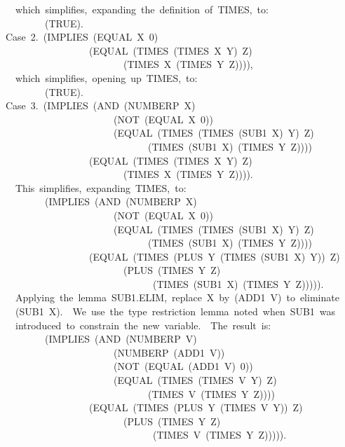 \documentclass[11pt]{book}
\newenvironment{pubasis}{\begin{flushleft}\ttfamily\small}{\normalsize\rmfamily\end{flushleft}}
\begin{document}
\begin{pubasis}
~~which~simplifies,~expanding~the~definition~of~TIMES,~to:\\

~~~~~~~~(TRUE).\\

Case~2.~(IMPLIES~(EQUAL~X~0)\\
~~~~~~~~~~~~~~~~~(EQUAL~(TIMES~(TIMES~X~Y)~Z)\\
~~~~~~~~~~~~~~~~~~~~~~~~(TIMES~X~(TIMES~Y~Z)))),\\

~~which~simplifies,~opening~up~TIMES,~to:\\

~~~~~~~~(TRUE).\\

Case~3.~(IMPLIES~(AND~(NUMBERP~X)\\
~~~~~~~~~~~~~~~~~~~~~~(NOT~(EQUAL~X~0))\\
~~~~~~~~~~~~~~~~~~~~~~(EQUAL~(TIMES~(TIMES~(SUB1~X)~Y)~Z)\\
~~~~~~~~~~~~~~~~~~~~~~~~~~~~~(TIMES~(SUB1~X)~(TIMES~Y~Z))))\\
~~~~~~~~~~~~~~~~~(EQUAL~(TIMES~(TIMES~X~Y)~Z)\\
~~~~~~~~~~~~~~~~~~~~~~~~(TIMES~X~(TIMES~Y~Z)))).\\

~~This~simplifies,~expanding~TIMES,~to:\\

~~~~~~~~(IMPLIES~(AND~(NUMBERP~X)\\
~~~~~~~~~~~~~~~~~~~~~~(NOT~(EQUAL~X~0))\\
~~~~~~~~~~~~~~~~~~~~~~(EQUAL~(TIMES~(TIMES~(SUB1~X)~Y)~Z)\\
~~~~~~~~~~~~~~~~~~~~~~~~~~~~~(TIMES~(SUB1~X)~(TIMES~Y~Z))))\\
~~~~~~~~~~~~~~~~~(EQUAL~(TIMES~(PLUS~Y~(TIMES~(SUB1~X)~Y))~Z)\\
~~~~~~~~~~~~~~~~~~~~~~~~(PLUS~(TIMES~Y~Z)\\
~~~~~~~~~~~~~~~~~~~~~~~~~~~~~~(TIMES~(SUB1~X)~(TIMES~Y~Z))))).\\

~~Applying~the~lemma~SUB1.ELIM,~replace~X~by~(ADD1~V)~to~eliminate\\
~~(SUB1~X).~~We~use~the~type~restriction~lemma~noted~when~SUB1~was\\
~~introduced~to~constrain~the~new~variable.~~The~result~is:\\

~~~~~~~~(IMPLIES~(AND~(NUMBERP~V)\\
~~~~~~~~~~~~~~~~~~~~~~(NUMBERP~(ADD1~V))\\
~~~~~~~~~~~~~~~~~~~~~~(NOT~(EQUAL~(ADD1~V)~0))\\
~~~~~~~~~~~~~~~~~~~~~~(EQUAL~(TIMES~(TIMES~V~Y)~Z)\\
~~~~~~~~~~~~~~~~~~~~~~~~~~~~~(TIMES~V~(TIMES~Y~Z))))\\
~~~~~~~~~~~~~~~~~(EQUAL~(TIMES~(PLUS~Y~(TIMES~V~Y))~Z)\\
~~~~~~~~~~~~~~~~~~~~~~~~(PLUS~(TIMES~Y~Z)\\
~~~~~~~~~~~~~~~~~~~~~~~~~~~~~~(TIMES~V~(TIMES~Y~Z))))).\\


\end{pubasis}
\end{document}
